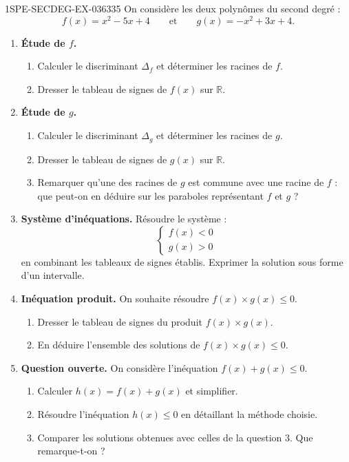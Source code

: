 \begin{exercice}{1SPE-SECDEG-EX-036}{3}{35}
On considère les deux polynômes du second degré :
\[
  f(x) = x^2 - 5x + 4 \qquad \text{et} \qquad g(x) = -x^2 + 3x + 4.
\]

\begin{enumerate}
  \item \textbf{Étude de $f$.}
  \begin{enumerate}
    \item Calculer le discriminant $\Delta_f$ et déterminer les racines de $f$.
    \item Dresser le tableau de signes de $f(x)$ sur $\mathbb{R}$.
  \end{enumerate}

  \item \textbf{Étude de $g$.}
  \begin{enumerate}
    \item Calculer le discriminant $\Delta_g$ et déterminer les racines de $g$.
    \item Dresser le tableau de signes de $g(x)$ sur $\mathbb{R}$.
    \item Remarquer qu'une des racines de $g$ est commune avec une racine de $f$ : que peut-on en déduire sur les paraboles représentant $f$ et $g$ ?
  \end{enumerate}

  \item \textbf{Système d'inéquations.} Résoudre le système :
  \[
    \begin{cases} f(x) < 0 \\ g(x) > 0 \end{cases}
  \]
  en combinant les tableaux de signes établis. Exprimer la solution sous forme d'un intervalle.

  \item \textbf{Inéquation produit.} On souhaite résoudre $f(x) \times g(x) \leq 0$.
  \begin{enumerate}
    \item Dresser le tableau de signes du produit $f(x) \times g(x)$.
    \item En déduire l'ensemble des solutions de $f(x) \times g(x) \leq 0$.
  \end{enumerate}

  \item \textbf{Question ouverte.} On considère l'inéquation $f(x) + g(x) \leq 0$.
  \begin{enumerate}
    \item Calculer $h(x) = f(x) + g(x)$ et simplifier.
    \item Résoudre l'inéquation $h(x) \leq 0$ en détaillant la méthode choisie.
    \item Comparer les solutions obtenues avec celles de la question 3. Que remarque-t-on ?
  \end{enumerate}
\end{enumerate}
\end{exercice}
